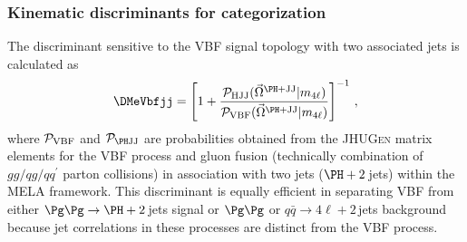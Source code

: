                                                                 
                                                                                                        
\subsubsection{Kinematic discriminants for categorization}

The discriminant sensitive to the VBF signal topology with two associated jets
is calculated as~\cite{Khachatryan:2015cwa, Khachatryan:2015mma} 
\begin{eqnarray}
%
\label{eq:vbfmela}
\DMeVbfjj = 
\left[1+
\frac{ \mathcal{P}_{\rm HJJ} (\vec\Omega^{\rm \PH+JJ} | m_{4\ell}) }
{\mathcal{P}_{\rm VBF}  (\vec\Omega^{\rm \PH+JJ} | m_{4\ell})  }\right]^{-1}
\,,
%
\end{eqnarray}
where $\mathcal{P}_{\rm VBF}$ and $\mathcal{P}_{\rm \PH JJ}$ are probabilities obtained from the 
\textsc{JHUGen} matrix elements for the VBF process and gluon fusion (technically combination of
$gg/qg/qq^\prime$ parton collisions)
in association with two jets ($\PH+2$\,jets) within the MELA framework.
This discriminant is equally efficient in separating VBF from either $\Pg\Pg\to\PH+2$\,jets signal or $\Pg\Pg$ 
or $q\bar{q}\to 4\ell+2$\,jets background because jet correlations in these processes are distinct from the VBF process. 

